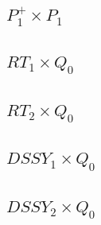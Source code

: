 \subsection*{$P_1^+\times P_1$}

\subsection*{$RT_1\times Q_0$}

\subsection*{$RT_2\times Q_0$}

\subsection*{$DSSY_1\times Q_0$}

\subsection*{$DSSY_2\times Q_0$}

